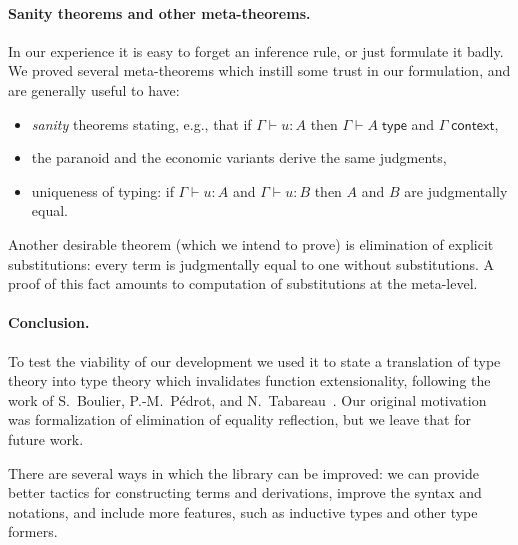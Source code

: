 \documentclass{easychair}
\newcommand{\ctx}{\Gamma}
\newcommand{\isctx}{\ctx\;\mathsf{context}}
\newcommand{\istype}[1]{\ctx \vdash #1 \;\mathsf{type}}
\newcommand{\isterm}[2]{\ctx \vdash #1 : #2}
\begin{document}
\paragraph*{Sanity theorems and other meta-theorems.}
\label{sec:sanity-theorems}

In our experience it is easy to forget an inference rule, or just formulate it badly. We
proved several meta-theorems which instill some trust in our formulation, and are
generally useful to have:
%
\begin{itemize}
\item \emph{sanity} theorems stating, e.g., that if $\isterm{u}{A}$ then $\istype{A}$ and $\isctx$,
\item the paranoid and the economic variants derive the same judgments,
\item uniqueness of typing: if $\isterm{u}{A}$ and $\isterm{u}{B}$ then $A$ and $B$ are
  judgmentally equal.
\end{itemize}
%
Another desirable theorem (which we intend to prove) is elimination of explicit
substitutions: every term is judgmentally equal to one without substitutions. A proof of
this fact amounts to computation of substitutions at the meta-level.



\paragraph*{Conclusion.}

To test the viability of our development we used it to state a translation of type theory
into type theory which invalidates function extensionality, following the work of
S.~Boulier, P.-M.~Pédrot, and N.~Tabareau~\cite{boulier17:_next_syntac_model_type_theor}.
Our original motivation was formalization of elimination of equality reflection, but we
leave that for future work.

There are several ways in which the library can be improved: we can provide better tactics
for constructing terms and derivations, improve the syntax and notations, and include more
features, such as inductive types and other type formers.





\end{document}
